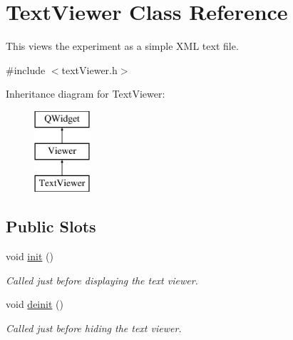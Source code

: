 \hypertarget{class_text_viewer}{\section{Text\-Viewer Class Reference}
\label{class_text_viewer}
}


This views the experiment as a simple X\-M\-L text file.  




{\ttfamily \#include $<$text\-Viewer.\-h$>$}

Inheritance diagram for Text\-Viewer\-:\begin{figure}[H]
\begin{center}
\leavevmode
\includegraphics[height=3.000000cm]{class_text_viewer}
\end{center}
\end{figure}
\subsection*{Public Slots}
\begin{DoxyCompactItemize}
\item 
\hypertarget{class_text_viewer_a81db8a0c7a3ade072e47d327fa4e0d57}{void \hyperlink{class_text_viewer_a81db8a0c7a3ade072e47d327fa4e0d57}{init} ()}\label{class_text_viewer_a81db8a0c7a3ade072e47d327fa4e0d57}

\begin{DoxyCompactList}\small\item\em Called just before displaying the text viewer. \end{DoxyCompactList}\item 
\hypertarget{class_text_viewer_a4c4bc1a3b8091e7d6fe62e79caaa36f8}{void \hyperlink{class_text_viewer_a4c4bc1a3b8091e7d6fe62e79caaa36f8}{deinit} ()}\label{class_text_viewer_a4c4bc1a3b8091e7d6fe62e79caaa36f8}

\begin{DoxyCompactList}\small\item\em Called just before hiding the text viewer. \end{DoxyCompactList}\end{DoxyCompactItemize}
